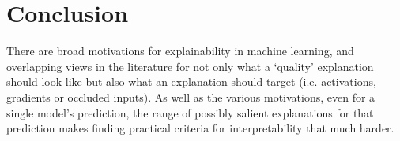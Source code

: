 \documentclass[main]{subfiles}
\begin{document}
\chapter{Conclusion}








There are broad motivations for explainability in machine learning, and overlapping views in the literature for not only what a `quality' explanation should look like but also what an explanation should target (i.e. activations, gradients or occluded inputs). As well as the various motivations, even for a single model's prediction, the range of possibly salient explanations for that prediction makes finding practical criteria for interpretability that much harder.
\end{document}
